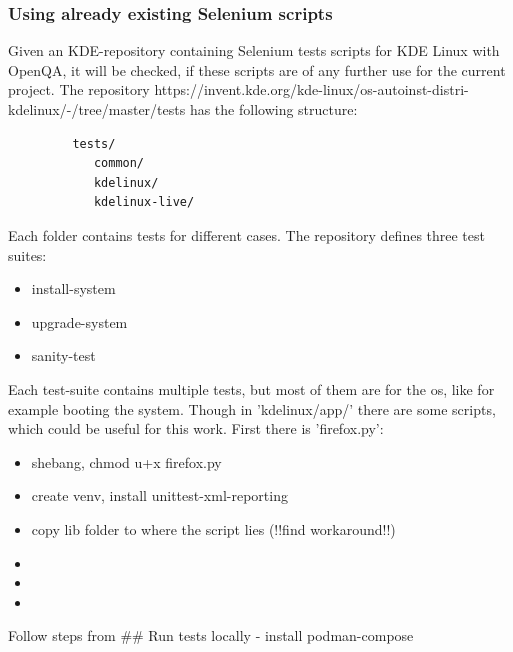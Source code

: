 \documentclass{article}
\begin{document}
        \subsubsection{Using already existing Selenium scripts}
        Given an KDE-repository containing Selenium tests scripts for KDE Linux with OpenQA, it will be checked, if these scripts are of any further use for the current project.
        The repository https://invent.kde.org/kde-linux/os-autoinst-distri-kdelinux/-/tree/master/tests has the following structure:
        \begin{lstlisting}
         tests/
            common/
            kdelinux/
            kdelinux-live/
        \end{lstlisting}
        Each folder contains tests for different cases. The repository defines three test suites:
        \begin{itemize}
         \item install-system
         \item upgrade-system
         \item sanity-test
        \end{itemize}
        Each test-suite contains multiple tests, but most of them are for the os, like for example booting the system.
        Though in 'kdelinux/app/' there are some scripts, which could be useful for this work.
        First there is 'firefox.py':

        \begin{itemize}
         \item shebang, chmod u+x firefox.py
         \item create venv, install unittest-xml-reporting
         \item copy lib folder to where the script lies (!!find workaround!!)
         \item
         \item
         \item
        \end{itemize}


        Follow steps from \#\# Run tests locally - install podman-compose


%
\end{document}
